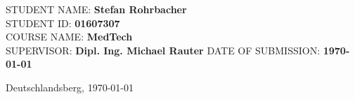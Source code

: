 \makeatletter

\begin{titlepage}
	\thispagestyle{empty}
	\vspace*{\dimexpr-1cm-\topmargin-\headsep-\headheight-\baselineskip}%
	\hspace*{\dimexpr-4cm-\evensidemargin-\parindent}%

	\begin{center}
		{\noindent \linespread{1.3} \color{header-blue} \Huge \textbf{\@title} \par }
		\vspace{5pt}
		\vspace{20pt}
	\end{center}
	\hspace{-35mm}

	\vspace{15pt}
	\tabto{2cm}STUDENT NAME: \tabto{7cm}\textbf{Stefan Rohrbacher} \\
	\tabto{2cm}STUDENT ID: \tabto{7cm}\textbf{01607307} \\
	\tabto{2cm}COURSE NAME: \tabto{7cm}\textbf{MedTech}\\
	\vspace{15pt}
	\tabto{2cm}SUPERVISOR: \tabto{7cm}\textbf{Dipl. Ing. Michael Rauter}
	\tabto{2cm}DATE OF SUBMISSION: \tabto{7cm}\textbf{\today}

	\vfill

	Deutschlandsberg, \today

\end{titlepage}
\makeatother

